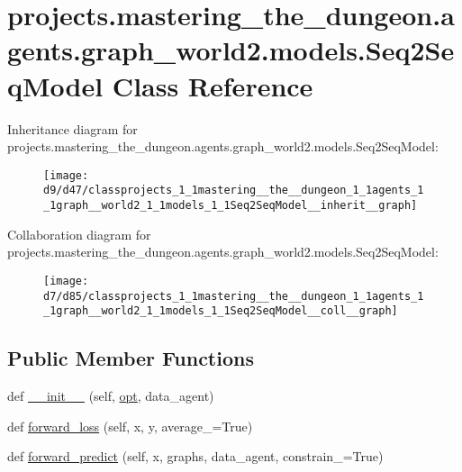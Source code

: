 \hypertarget{classprojects_1_1mastering__the__dungeon_1_1agents_1_1graph__world2_1_1models_1_1Seq2SeqModel}{}\section{projects.\+mastering\+\_\+the\+\_\+dungeon.\+agents.\+graph\+\_\+world2.\+models.\+Seq2\+Seq\+Model Class Reference}
\label{classprojects_1_1mastering__the__dungeon_1_1agents_1_1graph__world2_1_1models_1_1Seq2SeqModel}


Inheritance diagram for projects.\+mastering\+\_\+the\+\_\+dungeon.\+agents.\+graph\+\_\+world2.\+models.\+Seq2\+Seq\+Model\+:
\nopagebreak
\begin{figure}[H]
\begin{center}
\leavevmode
\texttt{[image: d9/d47/classprojects\_1\_1mastering\_\_the\_\_dungeon\_1\_1agents\_1\_1graph\_\_world2\_1\_1models\_1\_1Seq2SeqModel\_\_inherit\_\_graph]}
\end{center}
\end{figure}


Collaboration diagram for projects.\+mastering\+\_\+the\+\_\+dungeon.\+agents.\+graph\+\_\+world2.\+models.\+Seq2\+Seq\+Model\+:
\nopagebreak
\begin{figure}[H]
\begin{center}
\leavevmode
\texttt{[image: d7/d85/classprojects\_1\_1mastering\_\_the\_\_dungeon\_1\_1agents\_1\_1graph\_\_world2\_1\_1models\_1\_1Seq2SeqModel\_\_coll\_\_graph]}
\end{center}
\end{figure}
\subsection*{Public Member Functions}
\begin{DoxyCompactItemize}
\item 
def \hyperlink{classprojects_1_1mastering__the__dungeon_1_1agents_1_1graph__world2_1_1models_1_1Seq2SeqModel_a3e0966c82346420575a1b5d9e1d6dccb}{\+\_\+\+\_\+init\+\_\+\+\_\+} (self, \hyperlink{classprojects_1_1mastering__the__dungeon_1_1agents_1_1graph__world2_1_1models_1_1Seq2SeqModel_ab951839dadb60e2f0c663b7e19de1d7f}{opt}, data\+\_\+agent)
\item 
def \hyperlink{classprojects_1_1mastering__the__dungeon_1_1agents_1_1graph__world2_1_1models_1_1Seq2SeqModel_a643150fe7784a20ac0ed2e76ca9fc10a}{forward\+\_\+loss} (self, x, y, average\+\_\+=True)
\item 
def \hyperlink{classprojects_1_1mastering__the__dungeon_1_1agents_1_1graph__world2_1_1models_1_1Seq2SeqModel_af7293dc5efe834b8f176a5dd2cb7b770}{forward\+\_\+predict} (self, x, graphs, data\+\_\+agent, constrain\+\_\+=True)
\end{DoxyCompactItemize}

